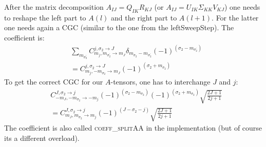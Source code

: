 \documentclass[a4paper,10pt,parskip=full]{scrartcl}
\begin{document}
After the matrix decomposition $A_{IJ}=Q_{IK}R_{KJ}$ (or
$A_{IJ}=U_{IK}\Sigma_{KK}V_{KJ}$) one needs to reshape the left part
to $A(l)$ and the right part to $A(l+1)$. For the latter one needs
again a CGC (similar to the one from the leftSweepStep). The
coefficient is:
\begin{equation}
  \begin{split}
    &\sum_{m_{\sigma_2^\prime}}C^{j,\sigma_2\rightarrow
      J}_{m_j,m_{\sigma_2^\prime}\rightarrow
      m_{J}}\delta_{m_{\sigma_2}-m_{\sigma_2^\prime}}(-1)^{(\sigma_2-m_{\sigma_2^\prime})}\\
    &=C^{j,\sigma_2\rightarrow
      J}_{m_j,-m_{\sigma_2}\rightarrow
      m_{J}}(-1)^{(\sigma_2+m_{\sigma_2})}
  \end{split}
\end{equation}
To get the correct CGC for our $A$-tensors, one has to interchange $J$
and $j$:
\begin{equation}
  \begin{split}
    &C^{J,\sigma_2\rightarrow
      j}_{-m_J,-m_{\sigma_2}\rightarrow
      -m_{j}}(-1)^{(\sigma_2-m_{\sigma_2})}(-1)^{(\sigma_2+m_{\sigma_2})}\sqrt{\frac{2J+1}{2j+1}}\\
    &=C^{J,\sigma_2\rightarrow
      j}_{m_J,m_{\sigma_2}\rightarrow
      m_{j}}(-1)^{(J-\sigma_2-j)}\sqrt{\frac{2J+1}{2j+1}}
  \end{split}
\end{equation}
The coefficient is also called \textsc{coeff\_splitAA} in the
implementation (but of course its a different overload).
\end{document}
